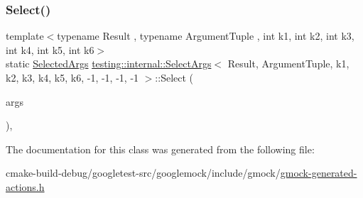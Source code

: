 \subsubsection{\texorpdfstring{Select()}{Select()}}
{\footnotesize\ttfamily template$<$typename Result , typename Argument\+Tuple , int k1, int k2, int k3, int k4, int k5, int k6$>$ \\
static \mbox{\hyperlink{classtesting_1_1internal_1_1SelectArgs_3_01Result_00_01ArgumentTuple_00_01k1_00_01k2_00_01k3_00_bb7097ad0bebc299c171ea7e2f7fc9a0_ad0660960820cc63f7f7a3b78c792c1e3}{Selected\+Args}} \mbox{\hyperlink{classtesting_1_1internal_1_1SelectArgs}{testing\+::internal\+::\+Select\+Args}}$<$ Result, Argument\+Tuple, k1, k2, k3, k4, k5, k6, -\/1, -\/1, -\/1, -\/1 $>$\+::Select (\begin{DoxyParamCaption}\item[{const Argument\+Tuple \&}]{args }\end{DoxyParamCaption})\hspace{0.3cm}{\ttfamily [inline]}, {\ttfamily [static]}}



The documentation for this class was generated from the following file\+:\begin{DoxyCompactItemize}
\item 
cmake-\/build-\/debug/googletest-\/src/googlemock/include/gmock/\mbox{\hyperlink{gmock-generated-actions_8h}{gmock-\/generated-\/actions.\+h}}\end{DoxyCompactItemize}
